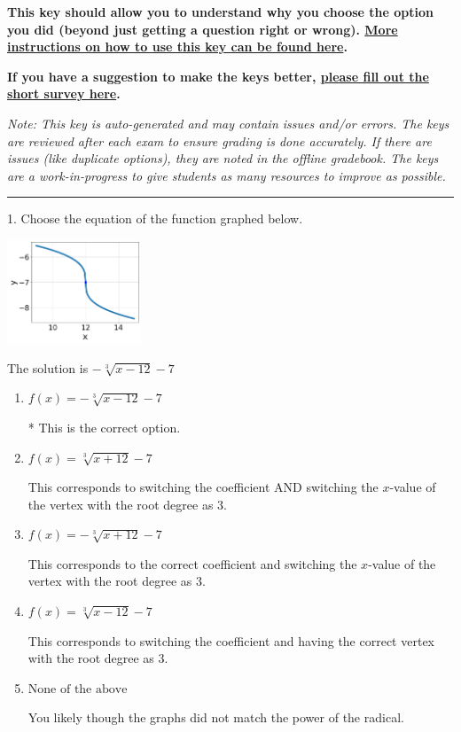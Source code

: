 \documentclass{extbook}[14pt]
\begin{document}
\textbf{This key should allow you to understand why you choose the option you did (beyond just getting a question right or wrong). \href{https://xronos.clas.ufl.edu/mac1105spring2020/courseDescriptionAndMisc/Exams/LearningFromResults}{More instructions on how to use this key can be found here}.}

\textbf{If you have a suggestion to make the keys better, \href{https://forms.gle/CZkbZmPbC9XALEE88}{please fill out the short survey here}.}

\textit{Note: This key is auto-generated and may contain issues and/or errors. The keys are reviewed after each exam to ensure grading is done accurately. If there are issues (like duplicate options), they are noted in the offline gradebook. The keys are a work-in-progress to give students as many resources to improve as possible.}

\rule{\textwidth}{0.4pt}

1. Choose the equation of the function graphed below.
\begin{center} \includegraphics[width=0.3\textwidth]{../Figures/radicalGraphToEquationA.png} \end{center} 

The solution is $ - \sqrt[3]{x - 12} - 7 $ 

\begin{enumerate}[label=\Alph*.] 
\item $ f(x) = - \sqrt[3]{x - 12} - 7 $ 

 * This is the correct option. 
\item $ f(x) = \sqrt[3]{x + 12} - 7 $ 

 This corresponds to switching the coefficient AND switching the $x$-value of the vertex with the root degree as $3$. 
\item $ f(x) = - \sqrt[3]{x + 12} - 7 $ 

 This corresponds to the correct coefficient and switching the $x$-value of the vertex with the root degree as $3$. 
\item $ f(x) = \sqrt[3]{x - 12} - 7 $ 

 This corresponds to switching the coefficient and having the correct vertex with the root degree as $3$. 
\item $ \text{None of the above} $ 

 You likely though the graphs did not match the power of the radical. 
\end{enumerate} 
 
\end{document}
